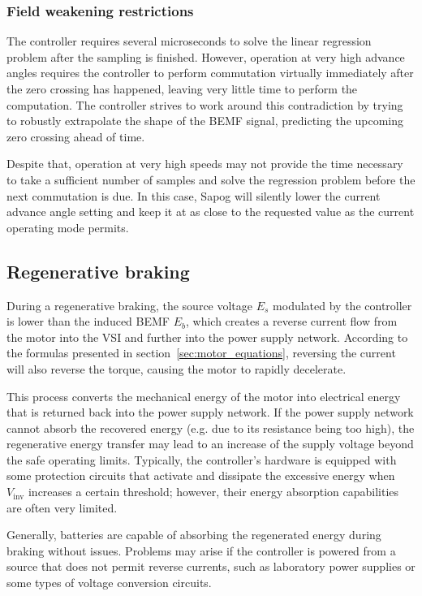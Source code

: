 \documentclass{zubaxdoc}
\begin{document}
\subsubsection{Field weakening restrictions}

The controller requires several microseconds to solve the linear regression problem after the sampling is
finished.
However, operation at very high advance angles requires the controller to perform commutation virtually
immediately after the zero crossing has happened, leaving very little time to perform the computation.
The controller strives to work around this contradiction by trying to robustly extrapolate the shape of the
BEMF signal, predicting the upcoming zero crossing ahead of time.

Despite that, operation at very high speeds may not provide the time necessary to take a sufficient
number of samples and solve the regression problem before the next commutation is due.
In this case, Sapog will silently lower the current advance angle setting and keep it at as close
to the requested value as the current operating mode permits.

\subsection{Regenerative braking}

During a regenerative braking, the source voltage $E_s$ modulated by the controller is lower than the
induced BEMF $E_b$, which creates a reverse current flow from the motor into the VSI
and further into the power supply network.
According to the formulas presented in section~\ref{sec:motor_equations},
reversing the current will also reverse the torque, causing the motor to rapidly decelerate.

This process converts the mechanical energy of the motor into electrical energy that is returned back into the
power supply network.
If the power supply network cannot absorb the recovered energy (e.g. due to its resistance being too high),
the regenerative energy transfer may lead to an increase of the supply voltage beyond the safe operating limits.
Typically, the controller's hardware is equipped with some protection circuits that activate and dissipate the
excessive energy when $V_\text{inv}$ increases a certain threshold;
however, their energy absorption capabilities are often very limited.

Generally, batteries are capable of absorbing the regenerated energy during braking without issues.
Problems may arise if the controller is powered from a source that does not permit reverse currents,
such as laboratory power supplies or some types of voltage conversion circuits.
\end{document}
